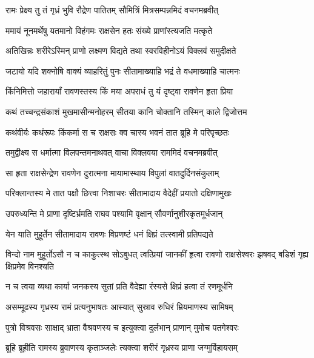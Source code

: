 
\twolineshloka
{रामः प्रेक्ष्य तु तं गृध्रं भुवि रौद्रेण पातितम्}
{सौमित्रिं मित्रसम्पन्नमिदं वचनमब्रवीत्} %

\twolineshloka
{ममायं नूनमर्थेषु यतमानो विहंगमः}
{राक्षसेन हतः संख्ये प्राणांस्त्यजति मत्कृते} %

\twolineshloka
{अतिखिन्नः शरीरेऽस्मिन् प्राणो लक्ष्मण विद्यते}
{तथा स्वरविहीनोऽयं विक्लवं समुदीक्षते} %

\twolineshloka
{जटायो यदि शक्नोषि वाक्यं व्याहरितुं पुनः}
{सीतामाख्याहि भद्रं ते वधमाख्याहि चात्मनः} %

\twolineshloka
{किंनिमित्तो जहारार्यां रावणस्तस्य किं मया}
{अपराधं तु यं दृष्ट्वा रावणेन हृता प्रिया} %

\twolineshloka
{कथं तच्चन्द्रसंकाशं मुखमासीन्मनोहरम्}
{सीतया कानि चोक्तानि तस्मिन् काले द्विजोत्तम} %

\twolineshloka
{कथंवीर्यः कथंरूपः किंकर्मा स च राक्षसः}
{क्व चास्य भवनं तात ब्रूहि मे परिपृच्छतः} %

\twolineshloka
{तमुद्वीक्ष्य स धर्मात्मा विलपन्तमनाथवत्}
{वाचा विक्लवया राममिदं वचनमब्रवीत्} %

\twolineshloka
{सा हृता राक्षसेन्द्रेण रावणेन दुरात्मना}
{मायामास्थाय विपुलां वातदुर्दिनसंकुलाम्} %

\twolineshloka
{परिक्लान्तस्य मे तात पक्षौ छित्त्वा निशाचरः}
{सीतामादाय वैदेहीं प्रयातो दक्षिणामुखः} %

\twolineshloka
{उपरुध्यन्ति मे प्राणा दृष्टिर्भ्रमति राघव}
{पश्यामि वृक्षान् सौवर्णानुशीरकृतमूर्धजान्} %

\twolineshloka
{येन याति मुहूर्तेन सीतामादाय रावणः}
{विप्रणष्टं धनं क्षिप्रं तत्स्वामी प्रतिपद्यते} %

\threelineshloka
{विन्दो नाम मुहूर्तोऽसौ न च काकुत्स्थ सोऽबुधत्}
{त्वत्प्रियां जानकीं हृत्वा रावणो राक्षसेश्वरः}
{झषवद् बडिशं गृह्य क्षिप्रमेव विनश्यति} %

\twolineshloka
{न च त्वया व्यथा कार्या जनकस्य सुतां प्रति}
{वैदेह्या रंस्यसे क्षिप्रं हत्वा तं रणमूर्धनि} %

\twolineshloka
{असम्मूढस्य गृध्रस्य रामं प्रत्यनुभाषतः}
{आस्यात् सुस्राव रुधिरं म्रियमाणस्य सामिषम्} %

\twolineshloka
{पुत्रो विश्रवसः साक्षाद् भ्राता वैश्रवणस्य च}
{इत्युक्त्वा दुर्लभान् प्राणान् मुमोच पतगेश्वरः} %

\twolineshloka
{ब्रूहि ब्रूहीति रामस्य ब्रुवाणस्य कृताञ्जलेः}
{त्यक्त्वा शरीरं गृध्रस्य प्राणा जग्मुर्विहायसम्} %

